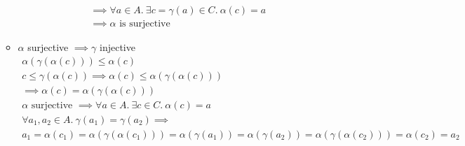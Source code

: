 \begin{exercise}
\begin{enumerate}[(1)]
\begin{itemize}
\begin{gather*}
                \implies \forall a \in A.\ \exists c = \gamma(a) \in C.\ \alpha(c) = a \\
                \implies \alpha \text{ is surjective}
            \end{gather*}
            \item $\alpha$ surjective $\implies \gamma$ injective
            \begin{gather*}
                \alpha(\gamma(\alpha(c))) \leq \alpha(c) \\
                c \leq \gamma(\alpha(c))
                \implies \alpha(c) \leq \alpha(\gamma(\alpha(c))) \\
                \implies \alpha(c) = \alpha(\gamma(\alpha(c))) \\
                \alpha \text{ surjective } \implies \forall a \in A.\ \exists c \in C.\ \alpha(c) = a \\
                \forall a_1, a_2 \in A.\ \gamma(a_1) = \gamma(a_2) \implies \\
                a_1 = \alpha(c_1) = \alpha(\gamma(\alpha(c_1))) = \alpha(\gamma(a_1)) = \alpha(\gamma(a_2)) = \alpha(\gamma(\alpha(c_2))) = \alpha(c_2) = a_2
            \end{gather*}
        \end{itemize}
    \end{enumerate}
\end{exercise}
